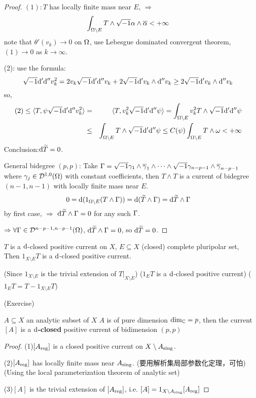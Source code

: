 \begin{proof}
$(1):T$ has locally finite mass near $E$, $\Rightarrow$
$$
  \int_{\Omega\setminus E}T\wedge\sqrt{-1}\alpha\wedge\overline{\alpha}
<+\infty
$$
note that $\theta'(v_k)\to 0$ on $\Omega$,
use Lebesgue dominated convergent theorem, $(1)\to 0$ as $k\to\infty$.

(2): use the formula:
$$
  \sqrt{-1}\mathrm{d}'\mathrm{d}'' v_k^2
=
  2v_k\sqrt{-1}\mathrm{d}'\mathrm{d}'' v_k+2\sqrt{-1}\mathrm{d}' v_k\wedge\mathrm{d}'' v_k
\geq
  2\sqrt{-1}\mathrm{d}'v_k\wedge\mathrm{d}'' v_k
$$
so,
\begin{eqnarray*}
  (2)\leq \langle T,\psi\sqrt{-1}\mathrm{d}'\mathrm{d}'' v_k^2 \rangle
&=&
  \langle T,v_k^2\sqrt{-1}\mathrm{d}'\mathrm{d}''\psi \rangle
=
  \int_{\Omega\setminus E}
    v_k^2T\wedge\sqrt{-1}\mathrm{d}'\mathrm{d}''\psi\\
&\leq&
  \int_{\Omega\setminus E}
    T\wedge\sqrt{-1}\mathrm{d}'\mathrm{d}''\psi
\leq
  C(\psi)\int_{\Omega\setminus E}T\wedge\omega
<+\infty
\end{eqnarray*}
Conclusion:$\mathrm{d}\widetilde{T}=0$.

General bidegree $(p,p)$: Take $\Gamma=\sqrt{-1}\gamma_1
\wedge\overline{\gamma}_1\wedge\cdots\wedge\sqrt{-1}\gamma_{n-p-1}\wedge\overline{\gamma}_{n-p-1}$
where $\gamma_j\in\mathcal{D}^{1,0}(\Omega)$ with constant coefficients,
then $T\wedge T$ is a current of bidegree $(n-1,n-1)$
with locally finite mass near $E$.
$$0=
  \mathrm{d}(1_{\Omega\setminus E}(T\wedge\Gamma))
= \mathrm{d}(\widetilde{T}\wedge\Gamma)=\mathrm{d}\widetilde{T}\wedge\Gamma
$$
by first case, $\Rightarrow$
$\mathrm{d}\widetilde{T}\wedge\Gamma=0$ for any such $\Gamma$.

$\Rightarrow\forall \Gamma\in\mathcal{D}^{n-p-1,n-p-1}(\Omega)$,
$\mathrm{d}\widetilde{T}\wedge\Gamma=0$, so $\mathrm{d}\widetilde{T}=0$.
\end{proof}

\begin{cor}
$T$ is a $\mathrm{d}$-closed positive current on $X$,
$E\subseteq X$ (closed) complete pluripolar set, Then
$1_{X\setminus E}T$ is a $\mathrm{d}$-closed positive current.
\end{cor}
(Since $1_{X\setminus E}$ is the trivial extension of $T|_{X\setminus E}$)
($1_{E}T$ is a $\mathrm{d}$-closed positive current)
($1_ET=T-1_{X\setminus E}T$)

\begin{cor}(Exercise)

$A\subseteq X$ an analytic subset of $X$
$A$ is of pure dimension $\dim_{\mathbb{C}}=p$, then the current
$[A]$ is a \textbf{$\mathrm{d}$-closed} positive current of bidimension $(p,p)$
\end{cor}

\begin{proof}
(1)$[A_{\operatorname{reg}}]$ is a closed positive current on $X\setminus A_{\operatorname{sing}}$.

(2)$[A_{\operatorname{reg}}]$ has locally finite mass near $A_{\operatorname{sing}}$.
(要用解析集局部参数化定理，可怕)
(Using the local parameterization theorem of analytic set)

(3)$[A]$ is the trivial extension of $[A_{\operatorname{reg}}]$,
i.e. $[A]=1_{X\setminus A_{\operatorname{sing}}}[A_{\operatorname{reg}}]$
\end{proof}

